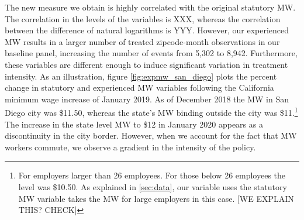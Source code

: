 The new measure we obtain is highly correlated with the original statutory MW. The 
correlation in the levels of the variables is XXX, whereas the correlation between the 
difference of natural logarithms is YYY. %
However, our experienced MW results in a larger number of treated zipcode-month 
observations in our baseline panel, increasing the number of events from 5,302 to 8,942. 
Furthermore, these variables are different enough to induce significant variation in 
treatment intensity. As an illustration, figure \ref{fig:expmw_san_diego} plots the 
percent change in statutory and experienced MW variables following the California minimum 
wage increase of January 2019. As of December 2018 the MW in San Diego city was \$11.50, 
whereas the state's MW binding outside the city was \$11.\footnote{For employers larger 
	than 26 employees. For those below 26 employees the level was \$10.50. As explained in 
	\autoref{sec:data}, our variable uses the statutory MW variable takes the MW for
	large employers in this case. [WE EXPLAIN THIS? CHECK]}
The increase in the state level MW to \$12 in January 2020 appears as a discontinuity in the 
city border. However, when we account for the fact that MW workers commute, we observe a 
gradient in the intensity of the policy.


